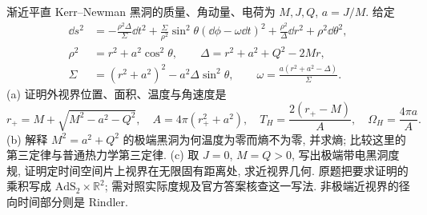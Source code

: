 \begin{exercise}
渐近平直 Kerr--Newman 黑洞的质量、角动量、电荷为 $M,J,Q$, $a=J/M$. 给定
\begin{align*}
\dd s^2&=-\frac{\rho^2\Delta}{\Sigma}\dd t^2
+\frac{\Sigma}{\rho^2}\sin^2\theta(\dd\phi-\omega\dd t)^2
+\frac{\rho^2}{\Delta}\dd r^2+\rho^2\dd\theta^2,\\
\rho^2&=r^2+a^2\cos^2\theta,\qquad
\Delta=r^2+a^2+Q^2-2Mr,\\
\Sigma&=(r^2+a^2)^2-a^2\Delta\sin^2\theta,\qquad
\omega=\frac{a(r^2+a^2-\Delta)}{\Sigma}.
\end{align*}
(a) 证明外视界位置、面积、温度与角速度是
\[
r_+=M+\sqrt{M^2-a^2-Q^2},\quad
A=4\pi(r_+^2+a^2),\quad
T_H=\frac{2(r_+-M)}A,\quad \Omega_H=\frac{4\pi a}A.
\]
(b) 解释 $M^2=a^2+Q^2$ 的极端黑洞为何温度为零而熵不为零, 并求熵; 比较这里的第三定律与普通热力学第三定律.
(c) 取 $J=0$, $M=Q>0$, 写出极端带电黑洞度规, 证明定时间空间片上视界在无限固有距离处, 求近视界几何. 原题把要求证明的乘积写成 $\mathrm{AdS}_2\times\mathbb R^2$; 需对照实际度规及官方答案核查这一写法. 非极端近视界的径向时间部分则是 Rindler.
\end{exercise}
